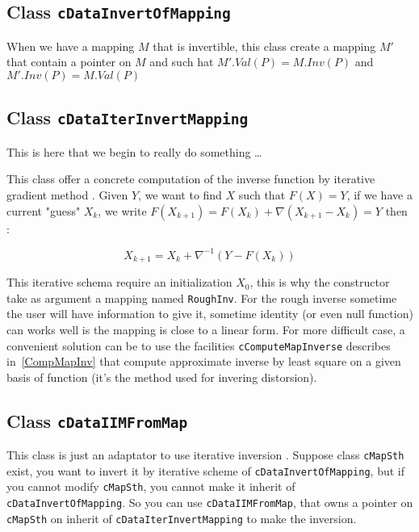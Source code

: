 \subsection{Class {\tt cDataInvertOfMapping}}

When we have a mapping $M$ that is invertible, this class create a mapping $M'$
that contain a pointer on $M$ and such hat  $M'.Val(P) = M.Inv(P)$ and $M'.Inv(P) = M.Val(P)$


\subsection{Class {\tt cDataIterInvertMapping}}

This is here that we begin to really do something \dots

This class offer a concrete computation of the inverse function by iterative gradient method .
Given $Y$, we want to find $X$  such that $F(X)=Y$,  if we have a current "guess" $X_k$,
we write $F(X_{k+1}) = F(X_k) + \nabla (X_{k+1}-X_k) = Y$ then :

\begin{equation}
	X_{k+1} = X_k + \nabla ^{-1} (Y-F(X_k))
\end{equation}

This iterative schema require an initialization $X_0$, this is why the constructor take as
argument a mapping named {\tt RoughInv}. For the rough inverse sometime the user
will have information to give it, sometime identity (or even 
null function) can works well is the mapping is close to a linear form.  For more difficult case,
a convenient solution can be to use the facilities {\tt cComputeMapInverse} describes in~\ref{CompMapInv}
that compute approximate inverse by least square on a given basis of function (it's the method
used for invering distorsion).

\subsection{Class {\tt cDataIIMFromMap}}

This class is just an adaptator to use iterative inversion . Suppose class {\tt cMapSth} exist,
you want to invert it by iterative scheme of  {\tt cDataInvertOfMapping}, but if you cannot
modify {\tt cMapSth}, you cannot make it inherit of {\tt cDataInvertOfMapping}. So you can
use {\tt cDataIIMFromMap}, that owns a pointer on {\tt cMapSth} on inherit of {\tt cDataIterInvertMapping}
to make the inversion.



